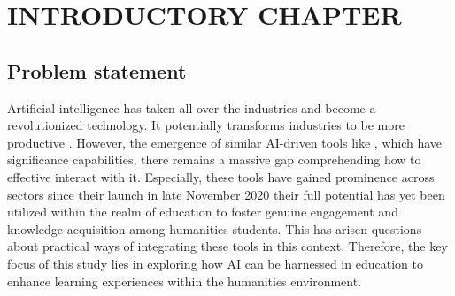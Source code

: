 \chapter{INTRODUCTORY CHAPTER}\label{ch:introductory-chapter}


\section{Problem statement}\label{sec:problem-statement}
\justifying


Artificial intelligence has taken all over the industries and become a revolutionized technology.
It potentially transforms industries to be more productive \textcite{Dirk_Czarnitzki_artificial_2023}.
However, the emergence of similar AI-driven tools like , which have significance
capabilities, there remains a massive gap comprehending how to effective
interact with it. Especially, these tools have gained prominence across
sectors since their launch in late November 2020 \textcite{MarrB_2023} their full potential
has yet been utilized within the realm of education to foster genuine
engagement and knowledge acquisition among humanities students. This has
arisen questions about practical ways of integrating these tools in this context.
Therefore, the key focus of this study lies in exploring how AI can be harnessed in education
to enhance learning experiences within the humanities environment.









